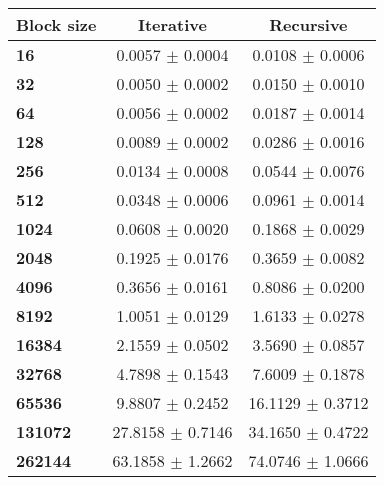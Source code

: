 \begin{tabular}{lcc}\toprule
\textbf{Block size}  & \textbf{Iterative} & \textbf{Recursive}\\\midrule
\textbf{16}  & 0.0057 $\pm$ 0.0004 & 0.0108 $\pm$ 0.0006\\
\textbf{32}  & 0.0050 $\pm$ 0.0002 & 0.0150 $\pm$ 0.0010\\
\textbf{64}  & 0.0056 $\pm$ 0.0002 & 0.0187 $\pm$ 0.0014\\
\textbf{128}  & 0.0089 $\pm$ 0.0002 & 0.0286 $\pm$ 0.0016\\
\textbf{256}  & 0.0134 $\pm$ 0.0008 & 0.0544 $\pm$ 0.0076\\
\textbf{512}  & 0.0348 $\pm$ 0.0006 & 0.0961 $\pm$ 0.0014\\
\textbf{1024}  & 0.0608 $\pm$ 0.0020 & 0.1868 $\pm$ 0.0029\\
\textbf{2048}  & 0.1925 $\pm$ 0.0176 & 0.3659 $\pm$ 0.0082\\
\textbf{4096}  & 0.3656 $\pm$ 0.0161 & 0.8086 $\pm$ 0.0200\\
\textbf{8192}  & 1.0051 $\pm$ 0.0129 & 1.6133 $\pm$ 0.0278\\
\textbf{16384}  & 2.1559 $\pm$ 0.0502 & 3.5690 $\pm$ 0.0857\\
\textbf{32768}  & 4.7898 $\pm$ 0.1543 & 7.6009 $\pm$ 0.1878\\
\textbf{65536}  & 9.8807 $\pm$ 0.2452 & 16.1129 $\pm$ 0.3712\\
\textbf{131072}  & 27.8158 $\pm$ 0.7146 & 34.1650 $\pm$ 0.4722\\
\textbf{262144} & 63.1858 $\pm$ 1.2662 & 74.0746 $\pm$ 1.0666\\
\bottomrule
\end{tabular}
